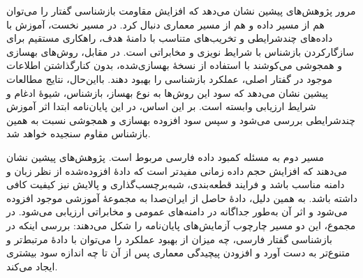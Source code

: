 
مرور پژوهش‌های پیشین نشان می‌دهد که افزایش مقاومت بازشناسی گفتار را می‌توان هم از مسیر داده و هم از مسیر معماری دنبال کرد. در مسیر نخست، آموزش با داده‌های چندشرایطی و تخریب‌های متناسب با دامنهٔ هدف، راهکاری مستقیم برای سازگارکردن بازشناس با شرایط نویزی و مخابراتی است. در مقابل، روش‌های بهسازی و همجوشی می‌کوشند با استفاده از نسخهٔ بهسازی‌شده، بدون کنارگذاشتن اطلاعات موجود در گفتار اصلی، عملکرد بازشناسی را بهبود دهند. بااین‌حال، نتایج مطالعات پیشین نشان می‌دهد که سود این روش‌ها به نوع بهساز، بازشناس، شیوهٔ ادغام و شرایط ارزیابی وابسته است. بر این اساس، در این پایان‌نامه ابتدا اثر آموزش چندشرایطی بررسی می‌شود و سپس سود افزوده بهسازی و همجوشی نسبت به همین بازشناس مقاوم سنجیده خواهد شد.

مسیر دوم به مسئله کمبود داده فارسی مربوط است. پژوهش‌های پیشین نشان می‌دهند که افزایش حجم داده زمانی مفیدتر است که دادهٔ افزوده‌شده از نظر زبان و دامنه مناسب باشد و فرایند قطعه‌بندی، شبه‌برچسب‌گذاری و پالایش نیز کیفیت کافی داشته باشد. به همین دلیل، دادهٔ حاصل از ایران‌صدا به مجموعهٔ آموزشی موجود افزوده می‌شود و اثر آن به‌طور جداگانه در دامنه‌های عمومی و مخابراتی ارزیابی می‌شود. در مجموع، این دو مسیر چارچوب آزمایش‌های پایان‌نامه را شکل می‌دهند: بررسی اینکه در بازشناسی گفتار فارسی، چه میزان از بهبود عملکرد را می‌توان با دادهٔ مرتبط‌تر و متنوع‌تر به دست آورد و افزودن پیچیدگی معماری پس از آن تا چه اندازه سود بیشتری ایجاد می‌کند.
